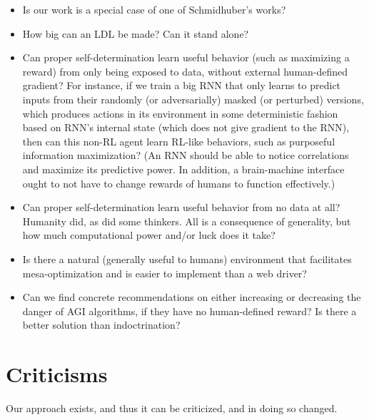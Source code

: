 \documentclass{article}
\begin{document}
\begin{itemize}
\item Is our work is a special case of one of Schmidhuber's works?

\item How big can an LDL be made? Can it stand alone?

\item Can proper self-determination learn useful behavior (such as maximizing a reward) from only being exposed to data, without external human-defined gradient? For instance, if we train a big RNN that only learns to predict inputs from their randomly (or adversarially) masked (or perturbed) versions, which produces actions in its environment in some deterministic fashion based on RNN's internal state (which does not give gradient to the RNN), then can this non-RL agent learn RL-like behaviors, such as purposeful information maximization? (An RNN should be able to notice correlations and maximize its predictive power. In addition, a brain-machine interface ought to not have to change rewards of humans to function effectively.)

\item Can proper self-determination learn useful behavior from no data at all? Humanity did, as did some thinkers. All is a consequence of generality, but how much computational power and/or luck does it take?

\item Is there a natural (generally useful to humans) environment that facilitates mesa-optimization and is easier to implement than a web driver?

\item Can we find concrete recommendations on either increasing or decreasing the danger of AGI algorithms, if they have no human-defined reward? Is there a better solution than indoctrination?
\end{itemize}

\section{Criticisms}

Our approach exists, and thus it can be criticized, and in doing so changed.
\end{document}
